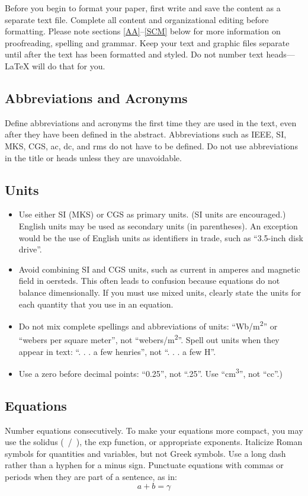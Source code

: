 \documentclass[conference]{IEEEtran}
\begin{document}
Before you begin to format your paper, first write and save the content as a 
separate text file. Complete all content and organizational editing before 
formatting. Please note sections \eqref{AA}--\eqref{SCM} below for more information on 
proofreading, spelling and grammar.
Keep your text and graphic files separate until after the text has been 
formatted and styled. Do not number text heads---{\LaTeX} will do that 
for you.
\subsection{Abbreviations and Acronyms}\label{AA}
Define abbreviations and acronyms the first time they are used in the text, 
even after they have been defined in the abstract. Abbreviations such as 
IEEE, SI, MKS, CGS, ac, dc, and rms do not have to be defined. Do not use 
abbreviations in the title or heads unless they are unavoidable.

\subsection{Units}
\begin{itemize}
\item Use either SI (MKS) or CGS as primary units. (SI units are encouraged.) English units may be used as secondary units (in parentheses). An exception would be the use of English units as identifiers in trade, such as ``3.5-inch disk drive''.
\item Avoid combining SI and CGS units, such as current in amperes and magnetic field in oersteds. This often leads to confusion because equations do not balance dimensionally. If you must use mixed units, clearly state the units for each quantity that you use in an equation.
\item Do not mix complete spellings and abbreviations of units: ``Wb/m\textsuperscript{2}'' or ``webers per square meter'', not ``webers/m\textsuperscript{2}''. Spell out units when they appear in text: ``. . . a few henries'', not ``. . . a few H''.
\item Use a zero before decimal points: ``0.25'', not ``.25''. Use ``cm\textsuperscript{3}'', not ``cc''.)
\end{itemize}

\subsection{Equations}
Number equations consecutively. To make your 
equations more compact, you may use the solidus (~/~), the exp function, or 
appropriate exponents. Italicize Roman symbols for quantities and variables, 
but not Greek symbols. Use a long dash rather than a hyphen for a minus 
sign. Punctuate equations with commas or periods when they are part of a 
sentence, as in:
\begin{equation}
a+b=\gamma\label{eq}
\end{equation}
\end{document}
